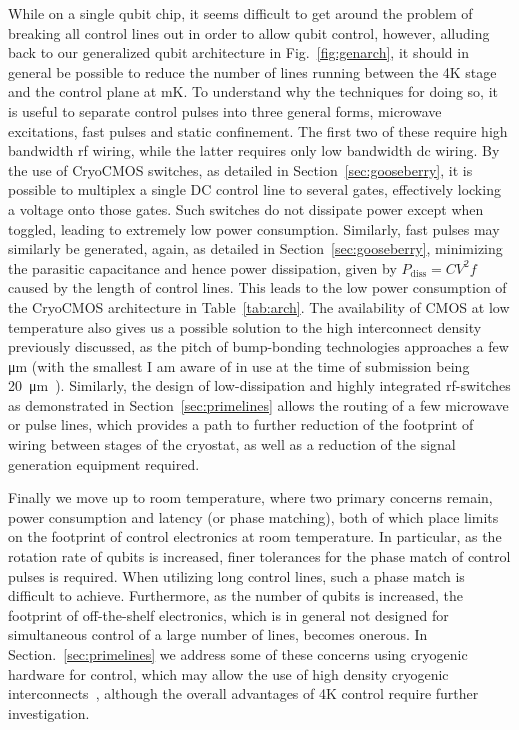 While on a single qubit chip, it seems difficult to get around the problem of breaking all control lines out in order to allow qubit control, however, alluding
back to our generalized qubit architecture in Fig.~\ref{fig:genarch}, it should in general be possible to reduce the number of lines running between the 4K stage
and the control plane at mK. To understand why the techniques for doing so, it is useful to separate control pulses into three general forms, microwave excitations,
fast pulses and static confinement. The first two of these require high bandwidth rf wiring, while the latter requires only low bandwidth dc wiring. By the use of
CryoCMOS switches, as detailed in Section~\ref{sec:gooseberry}, it is possible to multiplex a single DC control line to several gates, effectively locking
a voltage onto those gates. Such switches do not dissipate power except when toggled, leading to extremely low power consumption. Similarly, fast pulses may similarly
be generated, again, as detailed in Section~\ref{sec:gooseberry}, minimizing the parasitic capacitance and hence power dissipation, given by $P_\textrm{diss} = CV^2f$
caused by the length of control lines. This leads to the low power consumption of the CryoCMOS architecture in Table~\ref{tab:arch}. The availability of CMOS at low
temperature also gives us a possible solution to the high interconnect density previously discussed, as the pitch of bump-bonding technologies approaches a few \si{\micro\meter}
(with the smallest I am aware of in use at the time of submission being \SI{20}{\micro\meter}~\cite{4550089}). Similarly, the design of low-dissipation and highly integrated
rf-switches as demonstrated in Section~\ref{sec:primelines} allows the routing of a few microwave or pulse lines, which provides a path to further reduction of the footprint
of wiring between stages of the cryostat, as well as a reduction of the signal generation equipment required.

Finally we move up to room temperature, where two primary concerns remain, power consumption and latency (or phase matching), both of which place limits on the footprint
of control electronics at room temperature. In particular, as the rotation rate of qubits is increased, finer tolerances for the phase match of control pulses
is required. When utilizing long control lines, such a phase match is difficult to achieve. Furthermore, as the number of qubits is increased, the footprint of
off-the-shelf electronics, which is in general not designed for simultaneous control of a large number of lines, becomes onerous. In Section.~\ref{sec:primelines}
we address some of these concerns using cryogenic hardware for control, which may allow the use of high density cryogenic interconnects~\cite{Tuckerman_2016}, although
the overall advantages of 4K control require further investigation.

